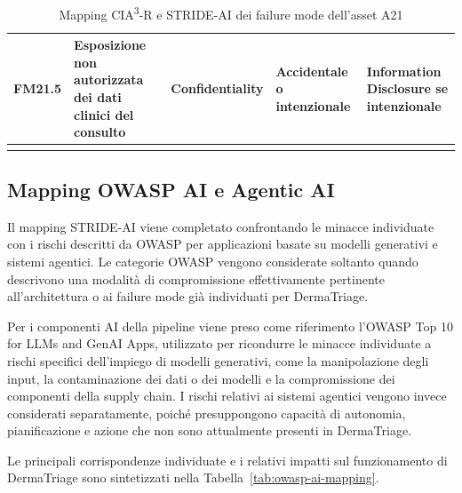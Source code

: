 {\begin{xltabular}{\textwidth}{
    >{\raggedright\arraybackslash}p{1.35cm}
    X
    >{\raggedright\arraybackslash}p{3.5cm}
    >{\raggedright\arraybackslash}p{2.7cm}
    >{\raggedright\arraybackslash}p{2.4cm}
}
\midrule


FM21.5 &

Esposizione non autorizzata dei dati clinici del consulto &

Confidentiality &

Accidentale o intenzionale &

Information Disclosure se intenzionale \\

\bottomrule

\caption{Mapping CIA\textsuperscript{3}-R e STRIDE-AI dei failure mode dell'asset A21}

\label{tab:a21-stride}\\

\end{xltabular}
}

\subsection{Mapping OWASP AI e Agentic AI}
Il mapping STRIDE-AI viene completato confrontando le minacce individuate con i
rischi descritti da OWASP per applicazioni basate su modelli generativi e sistemi
agentici. Le categorie OWASP vengono considerate soltanto quando descrivono una
modalità di compromissione effettivamente pertinente all'architettura o ai failure
mode già individuati per DermaTriage.

Per i componenti AI della pipeline viene preso come riferimento l'OWASP Top 10 for
LLMs and GenAI Apps, utilizzato per ricondurre le minacce individuate a rischi
specifici dell'impiego di modelli generativi, come la manipolazione degli input,
la contaminazione dei dati o dei modelli e la compromissione dei componenti della
supply chain. I rischi relativi ai sistemi agentici vengono invece considerati
separatamente, poiché presuppongono capacità di autonomia, pianificazione e azione
che non sono attualmente presenti in DermaTriage.

Le principali corrispondenze individuate e i relativi impatti sul funzionamento di
DermaTriage sono sintetizzati nella Tabella~\ref{tab:owasp-ai-mapping}.



